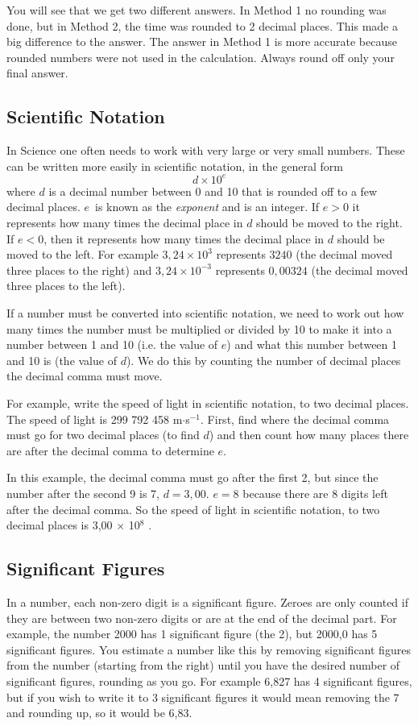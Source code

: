 \documentclass[10pt,a4paper,titlepage,twoside,openright]{report}
\begin{document}
You will see that we get two different answers. In Method 1 no rounding was done, but in Method 2, the time was rounded to 2 decimal places. This made a big difference to the answer. The answer in Method 1 is more accurate because rounded numbers were not used in the calculation. Always round off only your final answer.

\subsection{Scientific Notation}
In Science one often needs to work with very large or very small numbers. These can be written more easily in scientific notation, in the general form
\begin{equation*}
\label{mn:a:sci}
d \times 10^e
\end{equation*}
where $d$ is a decimal number between 0 and 10 that is rounded off to a few decimal places. $e$~is known as the \textit{exponent} and is an integer.
If $e>0$ it represents how many times the decimal place in $d$ should be moved to the right. If $e<0$, then it represents how many times the decimal place in $d$ should be moved to the left. For example $3,24\times 10^3$ represents $3240$ (the decimal moved three places to the right) and $3,24\times 10^{-3}$ represents $0,00324$ (the decimal moved three places to the left).

If a number must be converted into scientific notation, we need to work out how many times the number must be multiplied or divided by 10 to make it into a number between 1 and 10 (i.e. the value of $e$) and what this number between 1 and 10 is (the value of $d$). We do this by counting the number of decimal places the decimal comma must move.

For example, write the speed of light in scientific notation, to two decimal places. The speed of light is 299 792 458 m$\cdot$s$^{-1}$. First, find where the decimal comma must go for two decimal places (to find $d$) and then count how many places there are after the decimal comma to determine $e$.

In this example, the decimal comma must go after the first 2, but since the number after the second 9 is 7, $d=3,00$. $e=8$ because there are 8 digits left after the decimal comma. So the speed of light in scientific notation, to two decimal places is 3,00 $\times$ 10$^{8}$ \ms.

\pagebreak[4]
\subsection{Significant Figures}
In a number, each non-zero digit is a significant figure. Zeroes are only counted if they are between two non-zero digits or are at the end of the decimal part. For example, the number 2000 has 1 significant figure (the 2), but 2000,0 has 5 significant figures. You estimate a number like this by removing significant figures from the number (starting from the right) until you have the desired number of significant figures, rounding as you go. For example 6,827 has 4 significant figures, but if you wish to write it to 3 significant figures it would mean removing the 7 and rounding up, so it would be 6,83. 
\end{document}
